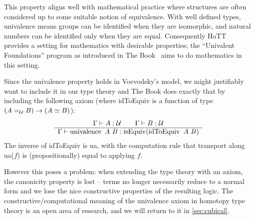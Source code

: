 This property aligns well with mathematical practice where structures are often
considered up to some suitable notion of equivalence. With well defined types,
univalence means groups can be identified when they are isomorphic, and natural
numbers can be identified only when they are equal.
Consequently HoTT provides a setting for mathematics with desirable properties; the ``Univalent
Foundations'' program as introduced in The Book~\cite{hottbook} aims to do
mathematics in this setting.

Since the univalence property holds in Voevodsky's model, we might justifiably want to
include it in our type theory and The Book does exactly that by including the following
axiom (where idToEquiv is a function of type $(A =_{\mathcal{U}} B) \rightarrow (A
\simeq B)$):
\begin{equation*}
  \begin{array}[t]{c}
    \Gamma \vdash A : \mathcal{U} \qquad \Gamma \vdash B : \mathcal{U}\\
    \hline
    \Gamma \vdash \operatorname{univalence}~A~B : \operatorname{isEquiv} (\operatorname{idToEquiv}~A~B)
  \end{array}
\end{equation*}
The inverse of idToEquiv is ua, with the computation rule that transport along
ua($f$) is (propositionally) equal to applying $f$.

However this poses a problem: when extending the
type theory with an axiom, the canonicity property is lost -- terms no longer
necessarily reduce to a normal form and we lose the nice constructive properties
of the resulting logic. The constructive/computational meaning of the univalence
axiom in homotopy type theory is an open area of research, and we will return to
it in \autoref{sec:cubical}.